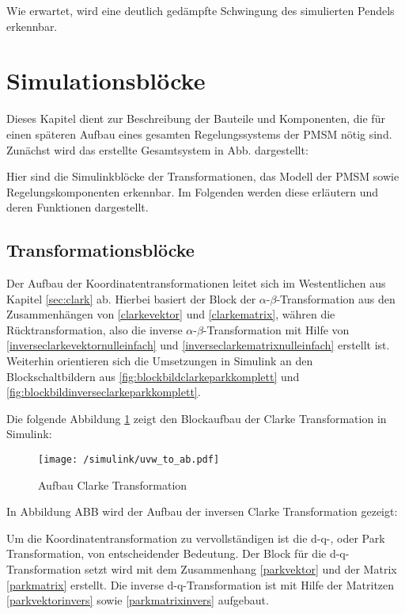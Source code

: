 Wie erwartet, wird eine deutlich gedämpfte Schwingung des simulierten Pendels erkennbar.

\section{Simulationsblöcke}\label{sec:math-model-pmsm}

Dieses Kapitel dient zur Beschreibung der Bauteile und Komponenten, die für einen späteren Aufbau eines gesamten Regelungssystems der PMSM nötig sind.
Zunächst wird das erstellte Gesamtsystem in Abb. dargestellt:

Hier sind die Simulinkblöcke der Transformationen, das Modell der PMSM sowie Regelungskomponenten erkennbar.
Im Folgenden werden diese erläutern und deren Funktionen dargestellt.

\subsection{Transformationsblöcke}

Der Aufbau der Koordinatentransformationen leitet sich im Westentlichen aus Kapitel \ref{sec:clark} ab. 
Hierbei basiert der Block der $\alpha$-$\beta$-Transformation aus den Zusammenhängen von \ref{clarkevektor} und \ref{clarkematrix}, währen die Rücktransformation, also die inverse $\alpha$-$\beta$-Transformation mit Hilfe von \ref{inverseclarkevektornulleinfach} und \ref{inverseclarkematrixnulleinfach} erstellt ist.
Weiterhin orientieren sich die Umsetzungen in Simulink an den Blockschaltbildern aus \ref{fig:blockbildclarkeparkkomplett} und \ref{fig:blockbildinverseclarkeparkkomplett}.

Die folgende Abbildung \ref{fig:uvw_to_ab} zeigt den Blockaufbau der Clarke Transformation in Simulink:

\begin{figure}[h]
	\centering
	\texttt{[image: /simulink/uvw\_to\_ab.pdf]}
	\label{fig:uvw_to_ab}
	\caption{Aufbau Clarke Transformation}
\end{figure}

In Abbildung ABB wird der Aufbau der inversen Clarke Transformation gezeigt:


Um die Koordinatentransformation zu vervollständigen ist die d-q-, oder Park Transformation, von entscheidender Bedeutung.
Der Block für die d-q-Transformation setzt wird mit dem Zusammenhang \ref{parkvektor} und der Matrix \ref{parkmatrix} erstellt. 
Die inverse d-q-Transformation ist mit Hilfe der Matritzen \ref{parkvektorinvers} sowie \ref{parkmatrixinvers} aufgebaut.

